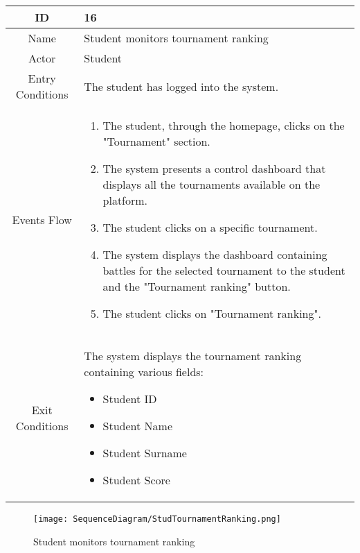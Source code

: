 \begin{longtable}{|c| p{10cm}|}
    \hline
        ID & 16 \\
    \hline
        Name & Student monitors tournament ranking \\
    \hline
        Actor & Student \\
    \hline
        Entry Conditions & 
The student has logged into the system.
\\
    \hline
        Events Flow &   \begin{enumerate}
                            \item The student, through the homepage, clicks on the "Tournament" section.
                            \item The system presents a control dashboard that displays all the tournaments available on the platform.
                            \item The student clicks on a specific tournament.
                            \item The system displays the dashboard containing battles for the selected tournament to the student and the "Tournament ranking" button.
                            \item The student clicks on "Tournament ranking".
                        \end{enumerate} \\
    \hline
        Exit Conditions &

The system displays the tournament ranking containing various fields:
            \begin{itemize}
                                \item Student ID
                                \item Student Name
                                \item Student Surname
                                \item Student Score
                            \end{itemize}
\\
    \hline
\end{longtable}

    \begin{figure}[H]
  \texttt{[image: SequenceDiagram/StudTournamentRanking.png]} 
  \caption{Student monitors tournament ranking}
  \label{fig:immagine}
\end{figure}

\newpage
